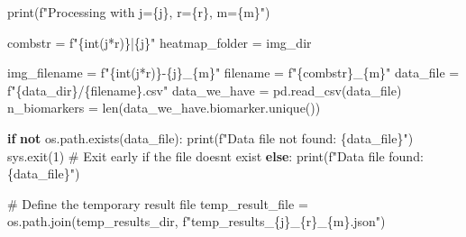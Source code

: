 \documentclass[
  letterpaper,
  DIV=11,
  numbers=noendperiod]{scrreprt}
\newenvironment{Shaded}{\begin{snugshade}}{\end{snugshade}}
\newcommand{\BuiltInTok}[1]{\textcolor[rgb]{0.00,0.23,0.31}{#1}}
\newcommand{\CommentTok}[1]{\textcolor[rgb]{0.37,0.37,0.37}{#1}}
\newcommand{\ControlFlowTok}[1]{\textcolor[rgb]{0.00,0.23,0.31}{\textbf{#1}}}
\newcommand{\DecValTok}[1]{\textcolor[rgb]{0.68,0.00,0.00}{#1}}
\newcommand{\KeywordTok}[1]{\textcolor[rgb]{0.00,0.23,0.31}{\textbf{#1}}}
\newcommand{\NormalTok}[1]{\textcolor[rgb]{0.00,0.23,0.31}{#1}}
\newcommand{\OperatorTok}[1]{\textcolor[rgb]{0.37,0.37,0.37}{#1}}
\newcommand{\SpecialCharTok}[1]{\textcolor[rgb]{0.37,0.37,0.37}{#1}}
\newcommand{\SpecialStringTok}[1]{\textcolor[rgb]{0.13,0.47,0.30}{#1}}
\begin{document}
\begin{Shaded}
\begin{Highlighting}[]
    \BuiltInTok{print}\NormalTok{(}\SpecialStringTok{f"Processing with j=}\SpecialCharTok{\{}\NormalTok{j}\SpecialCharTok{\}}\SpecialStringTok{, r=}\SpecialCharTok{\{}\NormalTok{r}\SpecialCharTok{\}}\SpecialStringTok{, m=}\SpecialCharTok{\{}\NormalTok{m}\SpecialCharTok{\}}\SpecialStringTok{"}\NormalTok{)}

\NormalTok{    combstr }\OperatorTok{=} \SpecialStringTok{f"}\SpecialCharTok{\{}\BuiltInTok{int}\NormalTok{(j}\OperatorTok{*}\NormalTok{r)}\SpecialCharTok{\}}\SpecialStringTok{|}\SpecialCharTok{\{}\NormalTok{j}\SpecialCharTok{\}}\SpecialStringTok{"}
\NormalTok{    heatmap\_folder }\OperatorTok{=}\NormalTok{ img\_dir}
    
\NormalTok{    img\_filename }\OperatorTok{=} \SpecialStringTok{f"}\SpecialCharTok{\{}\BuiltInTok{int}\NormalTok{(j}\OperatorTok{*}\NormalTok{r)}\SpecialCharTok{\}}\SpecialStringTok{{-}}\SpecialCharTok{\{}\NormalTok{j}\SpecialCharTok{\}}\SpecialStringTok{\_}\SpecialCharTok{\{}\NormalTok{m}\SpecialCharTok{\}}\SpecialStringTok{"}
\NormalTok{    filename }\OperatorTok{=} \SpecialStringTok{f"}\SpecialCharTok{\{}\NormalTok{combstr}\SpecialCharTok{\}}\SpecialStringTok{\_}\SpecialCharTok{\{}\NormalTok{m}\SpecialCharTok{\}}\SpecialStringTok{"}
\NormalTok{    data\_file }\OperatorTok{=} \SpecialStringTok{f"}\SpecialCharTok{\{}\NormalTok{data\_dir}\SpecialCharTok{\}}\SpecialStringTok{/}\SpecialCharTok{\{}\NormalTok{filename}\SpecialCharTok{\}}\SpecialStringTok{.csv"}
\NormalTok{    data\_we\_have }\OperatorTok{=}\NormalTok{ pd.read\_csv(data\_file)}
\NormalTok{    n\_biomarkers }\OperatorTok{=} \BuiltInTok{len}\NormalTok{(data\_we\_have.biomarker.unique())}

    \ControlFlowTok{if} \KeywordTok{not}\NormalTok{ os.path.exists(data\_file):}
        \BuiltInTok{print}\NormalTok{(}\SpecialStringTok{f"Data file not found: }\SpecialCharTok{\{}\NormalTok{data\_file}\SpecialCharTok{\}}\SpecialStringTok{"}\NormalTok{)}
\NormalTok{        sys.exit(}\DecValTok{1}\NormalTok{)  }\CommentTok{\# Exit early if the file doesn\textquotesingle{}t exist}
    \ControlFlowTok{else}\NormalTok{:}
        \BuiltInTok{print}\NormalTok{(}\SpecialStringTok{f"Data file found: }\SpecialCharTok{\{}\NormalTok{data\_file}\SpecialCharTok{\}}\SpecialStringTok{"}\NormalTok{)}

    \CommentTok{\# Define the temporary result file}
\NormalTok{    temp\_result\_file }\OperatorTok{=}\NormalTok{ os.path.join(temp\_results\_dir, }\SpecialStringTok{f"temp\_results\_}\SpecialCharTok{\{}\NormalTok{j}\SpecialCharTok{\}}\SpecialStringTok{\_}\SpecialCharTok{\{}\NormalTok{r}\SpecialCharTok{\}}\SpecialStringTok{\_}\SpecialCharTok{\{}\NormalTok{m}\SpecialCharTok{\}}\SpecialStringTok{.json"}\NormalTok{)}
    

\end{Highlighting}
\end{Shaded}
\end{document}

